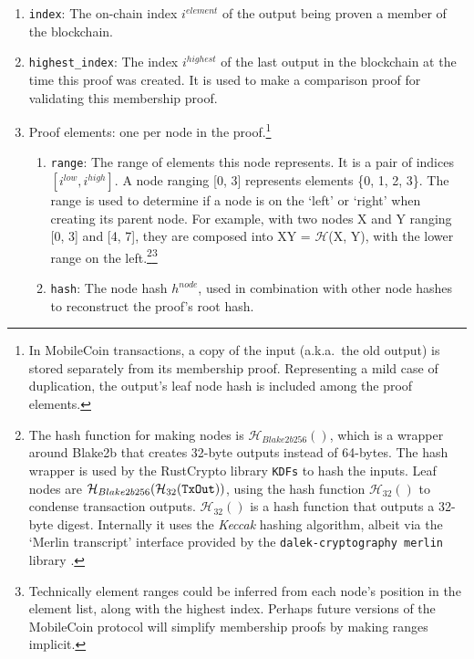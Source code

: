 \begin{enumerate}
    \item {\tt index}: The on-chain index $i^{element}$ of the output being proven a member of the blockchain.
    \item {\tt highest\_index}: The index $i^{highest}$ of the last output in the blockchain at the time this proof was created. It is used to make a comparison proof for validating this membership proof.
    \item Proof elements: one per node in the proof.\footnote{In MobileCoin transactions, a copy of the input (a.k.a.\ the old output) is stored separately from its membership proof. Representing a mild case of duplication, the output's leaf node hash is included among the proof elements.}
    \begin{enumerate}
        \item {\tt range}: The range of elements this node represents. It is a pair of indices $[i^{low}, i^{high}]$. A node ranging [0, 3] represents elements \{0, 1, 2, 3\}. The range is used to determine if a node is on the `left' or `right' when creating its parent node. For example, with two nodes X and Y ranging [0, 3] and [4, 7], they are composed into XY = $\mathcal{H}$(X, Y), with the lower range on the left.\footnote{The hash function for making nodes is $\mathcal{H}_{Blake2b256}()$, which is a wrapper around Blake2b that creates 32-byte outputs instead of 64-bytes. The hash wrapper is used by the RustCrypto library {\tt KDFs} \cite{kdfs-rust-lib, hkdf-rfc5869} to hash the inputs. Leaf nodes are $\mathcal{H}_{Blake2b256}(\mathcal{H}_{32}(\textrm{\tt TxOut}))$, using the hash function $\mathcal{H}_{32}()$ to condense transaction outputs. $\mathcal{H}_{32}()$ is a hash function that outputs a 32-byte digest. Internally it uses the {\em Keccak} hashing algorithm, albeit via the `Merlin transcript' interface \cite{merlin-transcripts} provided by the {\tt dalek-cryptography merlin} library \cite{dalek-merlin-lib}.}\footnote{Technically element ranges could be inferred from each node's position in the element list, along with the highest index. Perhaps future versions of the MobileCoin protocol will simplify membership proofs by making ranges implicit.}
        \item {\tt hash}: The node hash $h^{node}$, used in combination with other node hashes to reconstruct the proof's root hash.
    \end{enumerate}
\end{enumerate}

